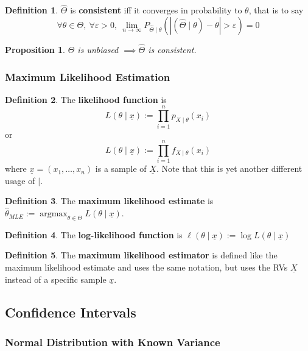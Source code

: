 \documentclass[12pt]{article}
\newtheorem*{prop*}{Proposition}
\theoremstyle{definition}
\newtheorem*{defn*}{Definition}
\DeclareMathOperator*{\argmax}{argmax}
\begin{document}
\begin{defn*}
  $\widehat{\Theta}$ is \textbf{consistent} iff it converges in probability to $\theta$, that is to say
  $$\forall \theta \in \Theta,\ \forall \varepsilon > 0,\ \lim_{n \to \infty}P_{\widehat{\Theta} \mid \theta}\left(\left\lvert\left(\widehat{\Theta} \mid \theta\right) - \theta\right\rvert > \varepsilon\right) = 0$$
\end{defn*}

\begin{prop*}
  $\widehat{\Theta}$ is unbiased $\implies \widehat{\Theta}$ is consistent.
\end{prop*}

\subsubsection{Maximum Likelihood Estimation}

\begin{defn*}
  The \textbf{likelihood function} is
  $$L(\theta \mid \underline{x}) := \prod_{i = 1}^np_{X \mid \theta}(x_i)$$
  or
  $$L(\theta \mid \underline{x}) := \prod_{i = 1}^nf_{X \mid \theta}(x_i)$$
  where $\underline{x} = (x_1, \ldots, x_n)$ is a sample of $\underline{X}$.
  Note that this is yet another different usage of $\mid$.
\end{defn*}

\begin{defn*}
  The \textbf{maximum likelihood estimate} is $\widehat{\theta}_{MLE} := \argmax_{\theta \in \Theta}L(\theta \mid \underline{x})$.
\end{defn*}

\begin{defn*}
  The \textbf{log-likelihood function} is $\ell(\theta \mid \underline{x}) := \log{L(\theta \mid \underline{x})}$
\end{defn*}

\begin{defn*}
  The \textbf{maximum likelihood estimator} is defined like the maximum likelihood estimate and uses the same notation, but uses the RVs $\underline{X}$ instead of a specific sample $\underline{x}$.
\end{defn*}

\subsection{Confidence Intervals}

\subsubsection{Normal Distribution with Known Variance}
\end{document}
